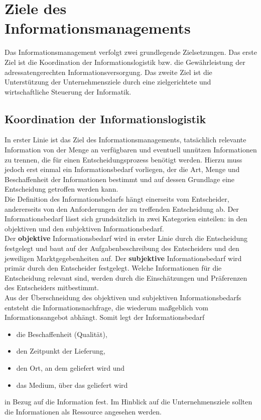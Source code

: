\section{Ziele des Informationsmanagements}
Das Informationsmanagement verfolgt zwei grundlegende Zielsetzungen. Das erste Ziel ist die Koordination der Informationslogistik bzw. die Gewährleistung der adressatengerechten Informationsversorgung. Das zweite Ziel ist die Unterstützung der Unternehmensziele durch eine zielgerichtete und wirtschaftliche Steuerung der Informatik.

\subsection{Koordination der Informationslogistik}
In erster Linie ist das Ziel des Informationsmanagements, tatsächlich relevante Information von der Menge an verfügbaren und eventuell unnützen Informationen zu trennen, die für einen Entscheidungsprozess benötigt werden. Hierzu muss jedoch erst einmal ein Informationsbedarf vorliegen, der die Art, Menge und Beschaffenheit der Informationen bestimmt und auf dessen Grundlage eine Entscheidung getroffen werden kann.\\

Die Definition des Informationsbedarfs hängt einerseits vom Entscheider, andererseits von den Anforderungen der zu treffenden Entscheidung ab.
Der Informationsbedarf lässt sich grundsätzlich in zwei Kategorien einteilen: in den objektiven und den subjektiven Informationsbedarf.\\

Der \textbf{objektive} Informationsbedarf wird in erster Linie durch die Entscheidung festgelegt und baut auf der Aufgabenbeschreibung des Entscheiders und den jeweiligen Marktgegebenheiten auf.
Der \textbf{subjektive} Informationsbedarf wird primär durch den Entscheider festgelegt. Welche Informationen für die Entscheidung relevant sind, werden durch die Einschätzungen und Präferenzen des Entscheiders mitbestimmt.\\

Aus der Überschneidung des objektiven und subjektiven Informationsbedarfs entsteht die Informationsnachfrage, die wiederum maßgeblich vom Informationsangebot abhängt. Somit legt der Informationsbedarf

\begin{itemize}
	 \item die Beschaffenheit (Qualität),
	 \item den Zeitpunkt der Lieferung,
	 \item den Ort, an dem geliefert wird und
	 \item das Medium, über das geliefert wird		 
\end{itemize}
in Bezug auf die Information fest. Im Hinblick auf die Unternehmensziele sollten die Informationen als Ressource angesehen werden. 

